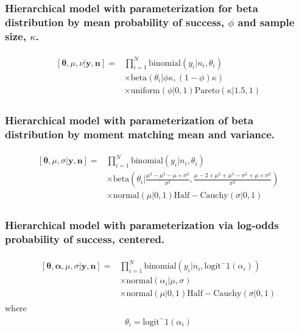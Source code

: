 \documentclass[12pt, oneside, titlepage]{article}   	%
\begin{document}
\subsubsection*{Hierarchical model with parameterization for beta distribution by mean probability of success, $\phi$ and sample size, $\kappa$.}
\begin{align}
  \begin{split}
[\bm{\theta},\mu,\nu|\bm{y},\bm{n}]  = & \prod_{i=1}^N \mathrm{binomial}(y_{i}|n_{i},\theta_{i}) 
    \\ & \times \mathrm{beta} (  \theta_{i} | \phi \kappa , (1-\phi) \kappa )
    \\ & \times \mathrm{uniform} ( \phi | 0, 1) \mathrm{Pareto} ( \kappa | 1.5, 1 )
  \end{split}
\end{align}
%
\subsubsection*{Hierarchical model with parameterization of beta distribution by moment matching mean and variance.}
\begin{align}
  \begin{split}
[\bm{\theta},\mu,\sigma|\bm{y},\bm{n}]  = & \prod_{i=1}^N \mathrm{binomial}(y_{i}|n_{i},\theta_{i}) 
    \\ & \times \mathrm{beta} (  \theta_{i} | \frac{\mu^2 - \mu^3 - \mu \times \sigma^2}{\sigma^2} , \frac{\mu - 2 \times \mu^2 + \mu^3 - \sigma^2 + \mu \times \sigma^2}{\sigma^2} )
    \\ & \times \mathrm{normal} ( \mu | 0, 1) \mathrm{Half-Cauchy} ( \sigma | 0, 1 )
   \end{split}
\end{align}
%
\subsubsection*{Hierarchical model with parameterization via log-odds probability of success, centered.}
\begin{align}
  \begin{split}
[\bm{\theta},\bm{\alpha},\mu,\sigma|\bm{y},\bm{n}]  = & \prod_{i=1}^N \mathrm{binomial}(y_{i}|n_{i},\mathrm{logit}^-1(\alpha_i)) 
    \\ & \times \mathrm{normal} (  \alpha_{i} | \mu, \sigma )
    \\ & \times \mathrm{normal} ( \mu | 0, 1) \mathrm{Half-Cauchy} ( \sigma | 0, 1 )
   \end{split}
\end{align}
where
\begin{align}
  \begin{split}
\theta_i = \mathrm{logit}^-1(\alpha_i)
   \end{split}
\end{align}
%
\end{document}
